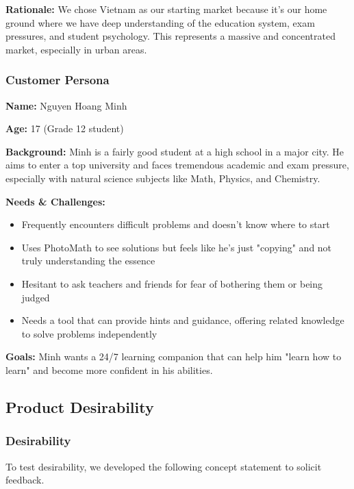 \textbf{Rationale:}
We chose Vietnam as our starting market because it's our home ground where we have deep understanding of the education
system, exam pressures, and student psychology. This represents a massive and concentrated market, especially in urban areas.

\subsubsection{Customer Persona}
\textbf{Name:} Nguyen Hoang Minh

\textbf{Age:} 17 (Grade 12 student)

\textbf{Background:} Minh is a fairly good student at a high school in a major city. He aims to enter a top university
and faces tremendous academic and exam pressure, especially with natural science subjects like Math, Physics, and Chemistry.

\textbf{Needs \& Challenges:}
\begin{itemize}
    \item Frequently encounters difficult problems and doesn't know where to start
    \item Uses PhotoMath to see solutions but feels like he's just "copying" and not truly understanding the essence
    \item Hesitant to ask teachers and friends for fear of bothering them or being judged
    \item Needs a tool that can provide hints and guidance, offering related knowledge to solve problems independently
\end{itemize}

\textbf{Goals:} Minh wants a 24/7 learning companion that can help him "learn how to learn" and become more confident in
his abilities.

\subsection{Product Desirability}
\subsubsection{Desirability}
To test desirability, we developed the following concept statement to solicit feedback.

\medskip

